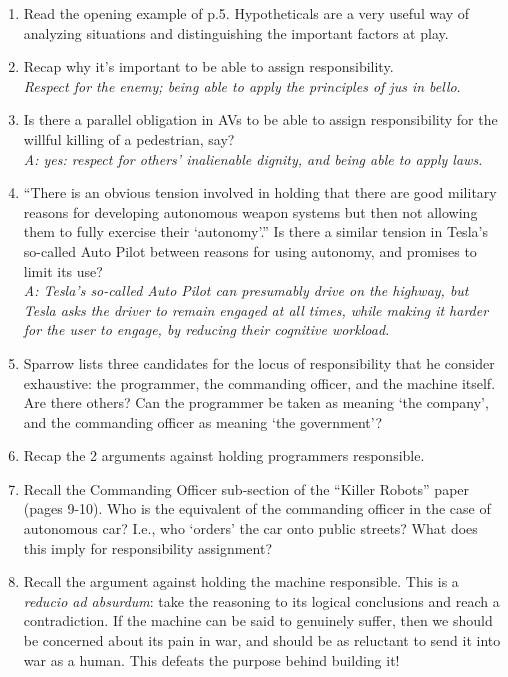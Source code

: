 \documentclass[letta4 paper]{article}
\numberwithin{equation}{section}
\newcommand{\0}{\mathbf{0}}
\begin{document}
\begin{enumerate}
		\item Read the opening example of p.5.
		Hypotheticals are a very useful way of analyzing situations and distinguishing the important factors at play.
		
		\item Recap why it's important to be able to assign responsibility.
		\\
		\textit{Respect for the enemy; being able to apply the principles of \textit{jus in bello}}.
		
		\item Is there a parallel obligation in AVs to be able to assign responsibility for the willful killing of a pedestrian, say?
		\\
		\textit{A: yes: respect for others' inalienable dignity, and being able to apply laws.}
		
		\item ``There is an obvious tension
		involved in holding that there are good military reasons for developing autonomous
		weapon systems but then not allowing them to fully exercise their `autonomy'.''
		Is there a similar tension in Tesla's so-called Auto Pilot between reasons for using autonomy, and promises to limit its use?
		\\
		\textit{A: Tesla's so-called Auto Pilot can presumably drive on the highway, but Tesla asks the driver to remain engaged at all times, while making it harder for the user to engage, by reducing their cognitive workload.}
		
		\item Sparrow lists three candidates for the locus of responsibility that he consider exhaustive: the programmer, the commanding officer, and the machine itself. Are there others? Can the programmer be taken as meaning `the company', and the commanding officer as meaning `the government'?	
		
		\item Recap the 2 arguments against holding programmers responsible. 
		
		\item Recall the Commanding Officer sub-section of the ``Killer Robots'' paper (pages 9-10). Who is the equivalent of the commanding officer in the case of autonomous car? I.e., who `orders' the car onto public streets? What does this imply for responsibility assignment?	
		
		\item Recall the argument against holding the machine responsible. This is a \textit{reducio ad absurdum}: take the reasoning to its logical conclusions and reach a contradiction. If the machine can be said to genuinely suffer, then we should be concerned about its pain in war, and should be as reluctant to send it into war as a human.
		This defeats the purpose behind building it!
		

\end{enumerate}
\end{document}
